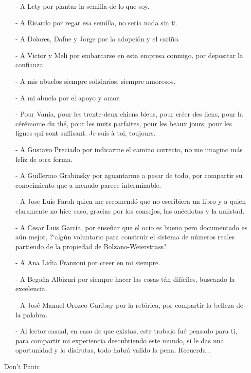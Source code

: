 \begin{acknowledgments}
\begin{itemize}
\setlength{\itemsep}{0pt}
\item[-] A Lety por plantar la semilla de lo que soy.
\item[-] A Ricardo por regar esa semilla, no ser\'ia nada sin ti.
\item[-] A Dolores, Dafne y Jorge por la adopci\'on y el cari\~no.
\item[-] A Victor y Meli por embarcarse en esta empresa conmigo, por depositar la confianza.
\item[-] A mis abuelos siempre solidarios, siempre amorosos.
\item[-] A mi abuela por el apoyo y amor.
\item[-] Pour Vania, pour les trente-deux chiens bleus, pour cr\'eer des liens, pour la c\'er\'emonie du th\'e, pour les nuits parfaites, pour les beaux jours, pour les lignes qui sont suffisant. Je suis \`a toi, toujours.
\item[-] A Gustavo Preciado por indicarme el camino correcto, no me imagino m\'as feliz de otra forma.
\item[-] A Guillermo Grabinsky por aguantarme a pesar de todo, por compartir su conocimiento que a menudo parece interminable.
\item[-] A Jose Luis Farah quien me recomend\'o que no escribiera un libro y a quien claramente no hice caso, gracias por los consejos, las an\'ecdotas y la amistad.
\item[-] A Cesar Luis Garc\'ia, por ense\~nar que el ocio es bueno pero documentado es a\'un mejor, ?`alg\'un voluntario para construir el sistema de n\'umeros reales partiendo de la propiedad de Bolzano-Weierstrass?
\item[-] A Ana Lidia Franzoni por creer en mi siempre.
\item[-] A Bego\~na Albizuri por siempre hacer las cosas t\'an dif\'iciles, buscando la excelencia.
\item[-] A Jos\'e Manuel Orozco Garibay por la ret\'orica, por compartir la belleza de la palabra.
\item[-] Al lector casual, en caso de que existas, este trabajo fu\'e pensado para ti, para compartir mi experiencia descubriendo este mundo, si le das una oportunidad y lo disfrutas, todo habr\'a valido la pena. Recuerda...
\end{itemize}
\begin{center}
\Huge Don't Panic
\end{center}
\end{acknowledgments}